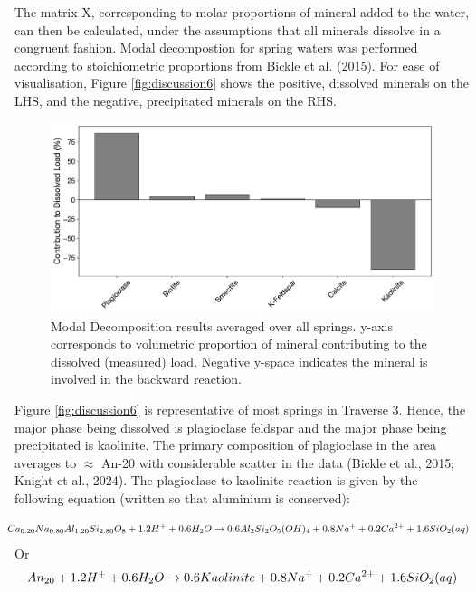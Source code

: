 The matrix X, corresponding to molar proportions of mineral added to the water, can then be calculated, under the assumptions that all minerals dissolve in a congruent fashion. Modal decompostion for spring waters was performed according to stoichiometric proportions from Bickle et al. (2015). For ease of visualisation, Figure \ref{fig:discussion6} shows the positive, dissolved minerals on the LHS, and the negative, precipitated minerals on the RHS.\\

\begin{figure}[h]
    \centering
    \includegraphics[width=\textwidth]{Normalized_Average_Mineral_Volume_Changes.pdf}
    \caption{Modal Decomposition results averaged over all springs. y-axis corresponds to volumetric proportion of mineral contributing to the dissolved (measured) load. Negative y-space indicates the mineral is involved in the backward reaction.}
    \label{fig:modal}
\end{figure}

\FloatBarrier

Figure \ref{fig:discussion6} is representative of most springs in Traverse 3. Hence, the major phase being dissolved is plagioclase feldspar and the major phase being precipitated is kaolinite. The primary composition of plagioclase in the area averages to $\approx$ An-20 with considerable scatter in the data (Bickle et al., 2015; Knight et al., 2024).  The plagioclase to kaolinite reaction is given by the following equation (written so that aluminium is conserved):

\begin{equation}
    \hspace{-0.3cm}
    \small
    Ca_{0.20}Na_{0.80}Al_{1.20}Si_{2.80}O_{8} + 1.2H^{+} + 0.6 H_{2}O \rightarrow 
    0.6 Al_{2}Si_{2}O_{5}(OH)_{4} + 0.8 Na^{+} + 0.2 Ca^{2+} + 1.6 SiO_{2}(aq)
\end{equation}
\quad Or
\begin{equation}
    \small
    An_{20} + 1.2 H^{+} + 0.6 H_{2}O \rightarrow
    0.6 Kaolinite + 0.8 Na^{+} + 0.2 Ca^{2+} + 1.6 SiO_{2}(aq)
\label{eq:10}
\end{equation}




